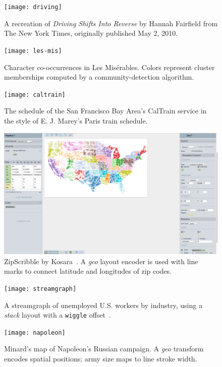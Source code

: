 \begin{figure}[h!]
  \centering
  \texttt{[image: driving]}
  \caption{A recreation of \emph{Driving Shifts Into Reverse} by Hannah
  Fairfield from The New York Times, originally published May 2, 2010.}
  \label{fig:lyra:gas_driving}
\end{figure}

\begin{figure}[h!]
  \centering
  \texttt{[image: les-mis]}
  \caption{Character co-occurrences in Les
Mis\'{e}rables. Colors represent cluster memberships computed by a
community-detection algorithm.}
  \label{fig:lyra:les_mis}
\end{figure}

\begin{figure}[h!]
  \centering
  \texttt{[image: caltrain]}
  \caption{The schedule of the San Francisco Bay Area's CalTrain service in the style of E. J. Marey's Paris train schedule.}
  \label{fig:lyra:caltrain}
\end{figure}

\begin{figure}[h!]
  \centering
  \includegraphics[width=\columnwidth]{zipscribble}
  \caption{ZipScribble by Kosara~\cite{kosara:zipscribble}. A \emph{geo} layout
 encoder is used with line marks to connect latitude and longitudes of zip
 codes.}
  \label{fig:lyra:zipscribble}
\end{figure}

\begin{figure}[h!]
  \centering
  \texttt{[image: streamgraph]}
  \caption{A streamgraph of unemployed U.S. workers by industry, using a
  \emph{stack} layout with a \texttt{wiggle} offset~\cite{byron:streamgraph}.}
  \label{fig:lyra:streamgraph}
\end{figure}

\begin{figure}[h!]
  \centering
  \texttt{[image: napoleon]}
  \caption{Minard's map of Napoleon's Russian campaign. A \emph{geo} transform
 encodes spatial positions; army size maps to line stroke width.}
  \label{fig:lyra:napoleon}
\end{figure}

